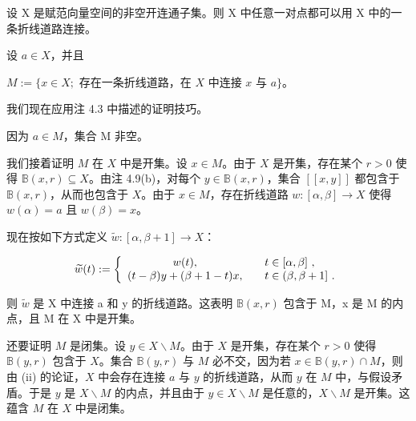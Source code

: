 \begin{theorem}

设 X 是赋范向量空间的非空开连通子集。则 X 中任意一对点都可以用 X 中的一条折线道路连接。

\proofhead
设 $ a \in X $，并且

$ M := \{ x \in X ; \text{ 存在一条折线道路，在 } X \text{ 中连接 } x \text{ 与 } a \} $。

我们现在应用注 4.3 中描述的证明技巧。

\begin{subitems}
\item

因为 $ a \in M $，集合 M 非空。

\item

我们接着证明 $M$ 在 $X$ 中是开集。设 $x \in M$。由于 $X$ 是开集，存在某个 $r > 0$ 使得 $\mathbb{B}(x, r) \subseteq X$。由注 4.9(b)，对每个 $y \in \mathbb{B}(x, r)$，集合 $\left[\!\!\left[x, y\right]\!\!\right]$ 都包含于 $\mathbb{B}(x, r)$，从而也包含于 $X$。由于 $x \in M$，存在折线道路 $w: [\alpha, \beta] \to X$ 使得 $w(\alpha) = a$ 且 $w(\beta) = x$。

\end{subitems}


现在按如下方式定义 $ \widetilde{w}: [\alpha, \beta + 1] \to X $：

\begin{equation*}
\widetilde{w}(t):=\left\{\begin{array}{c l}{w(t),}&{\quad t\in[\alpha,\beta]~,}\\ {(t-\beta)y+(\beta+1-t)x,}&{\quad t\in(\beta,\beta+1]~.}\\ \end{array}\right.
\end{equation*}

则 $ \tilde{w} $ 是 X 中连接 a 和 y 的折线道路。这表明 $ \mathbb{B}(x,r) $ 包含于 M，x 是 M 的内点，且 M 在 X 中是开集。

\begin{subitems}
\item[（iii）]

还要证明 $M$ 是闭集。设 $y \in X \backslash M$。由于 $X$ 是开集，存在某个 $r > 0$ 使得 $\mathbb{B}(y, r)$ 包含于 $X$。集合 $\mathbb{B}(y, r)$ 与 $M$ 必不交，因为若 $x \in \mathbb{B}(y, r) \cap M$，则由 (ii) 的论证，$X$ 中会存在连接 $a$ 与 $y$ 的折线道路，从而 $y$ 在 $M$ 中，与假设矛盾。于是 $y$ 是 $X \backslash M$ 的内点，并且由于 $y \in X \backslash M$ 是任意的，$X \backslash M$ 是开集。这蕴含 $M$ 在 $X$ 中是闭集。

\end{subitems}

\end{theorem}

